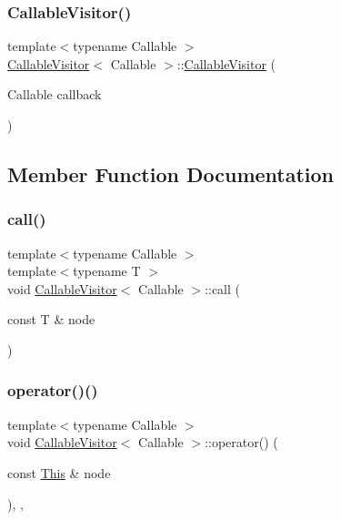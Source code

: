 \subsubsection{\texorpdfstring{Callable\+Visitor()}{CallableVisitor()}}
{\footnotesize\ttfamily template$<$typename Callable $>$ \\
\hyperlink{struct_callable_visitor}{Callable\+Visitor}$<$ Callable $>$\+::\hyperlink{struct_callable_visitor}{Callable\+Visitor} (\begin{DoxyParamCaption}\item[{Callable}]{callback }\end{DoxyParamCaption})\hspace{0.3cm}{\ttfamily [inline]}}



\subsection{Member Function Documentation}
\mbox{\label{struct_callable_visitor_a4ce6de39a481c39fd7eda7a317bef28a}} 
\subsubsection{\texorpdfstring{call()}{call()}}
{\footnotesize\ttfamily template$<$typename Callable $>$ \\
template$<$typename T $>$ \\
void \hyperlink{struct_callable_visitor}{Callable\+Visitor}$<$ Callable $>$\+::call (\begin{DoxyParamCaption}\item[{const T \&}]{node }\end{DoxyParamCaption})\hspace{0.3cm}{\ttfamily [inline]}}

\mbox{\label{struct_callable_visitor_ac435fdf6fcab885cf21f27364883c8ad}} 
\subsubsection{\texorpdfstring{operator()()}{operator()()}\hspace{0.1cm}{\footnotesize\ttfamily [1/44]}}
{\footnotesize\ttfamily template$<$typename Callable $>$ \\
void \hyperlink{struct_callable_visitor}{Callable\+Visitor}$<$ Callable $>$\+::operator() (\begin{DoxyParamCaption}\item[{const \hyperlink{struct_this}{This} \&}]{node }\end{DoxyParamCaption})\hspace{0.3cm}{\ttfamily [inline]}, {\ttfamily [override]}, {\ttfamily [virtual]}}



